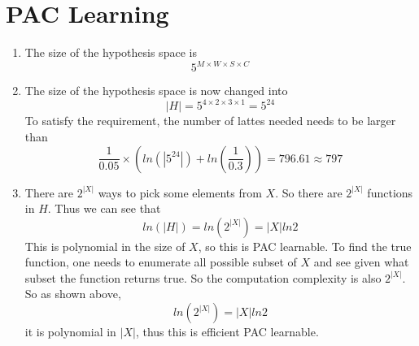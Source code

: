 \documentclass{article}
\begin{document}
	\section{PAC Learning}
		\begin{enumerate}
			\item The size of the hypothesis space is \begin{displaymath}
				5^{M \times W \times S \times C}
				\end{displaymath}
			\item The size of the hypothesis space is now changed into \begin{displaymath}
				|H| = 5^{4 \times 2 \times 3 \times 1} = 5^{24}
				\end{displaymath}
				To satisfy the requirement, the number of lattes needed needs to be larger than
				\begin{equation}
					\frac{1}{0.05}\times(ln(|5^{24}|) + ln(\frac{1}{0.3})) = 796.61 \approx 797
				\end{equation}
			\item There are $2^{|X|}$ ways to pick some elements from $X$. So there are $2^{|X|}$ functions in $H$. Thus we can see that \begin{equation}
				ln(|H|) = ln(2^{|X|}) = |X|ln2
				\end{equation}
				This is polynomial in the size of $X$, so this is PAC learnable. To find the true function, one needs to enumerate all possible subset of $X$ and see given what subset the function returns true. So the computation complexity is also $2^{|X|}$. So as shown above, 
				\begin{displaymath}
					ln(2^{|X|}) = |X|ln2
				\end{displaymath}
				it is polynomial in $|X|$, thus this is efficient PAC learnable.

		\end{enumerate}
\end{document}
